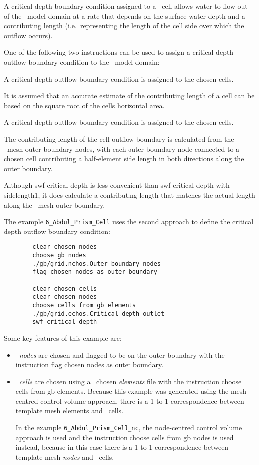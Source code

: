 A critical depth boundary condition assigned to a \swf\ cell allows water to flow out of the \swf\ model domain at a rate that depends on the surface water depth and a contributing length (i.e.\ representing the length of the cell side over which the outflow occurs).

\pagebreak
One of the following two  instructions can be used to assign a critical depth outflow boundary condition to the \swf\ model domain:

    {
          A critical depth outflow boundary condition is assigned to the chosen cells.

          It is assumed that an accurate estimate of the contributing length of a cell can be based on the square root of the cells horizontal area.
    }


    {
          A critical depth outflow boundary condition is assigned to the chosen cells.

          The contributing length of the cell outflow boundary is calculated from the \swf\ mesh outer boundary nodes, with each outer boundary node connected to a chosen cell contributing a half-element side length in both directions along the outer boundary.
    }

Although \textsf{swf critical depth} is less convenient than \textsf{swf critical depth with sidelength1}, it does calculate a contributing length that matches the actual length along the \swf\ mesh outer boundary.

The example \texttt{6\_Abdul\_Prism\_Cell} uses the second approach to define the critical depth outflow boundary condition:
\begin{verbatim}
        clear chosen nodes
        choose gb nodes
        ./gb/grid.nchos.Outer boundary nodes
        flag chosen nodes as outer boundary

        clear chosen cells
        clear chosen nodes
        choose cells from gb elements
        ./gb/grid.echos.Critical depth outlet
        swf critical depth
\end{verbatim}

Some key features of this example are:
\begin{itemize}
    \item \swf\ {\em nodes} are chosen and flagged to be on the outer boundary with the instruction \textsf{flag chosen nodes as outer boundary}.
    \item \swf\ {\em cells} are chosen using a \gb\ chosen {\em elements} file with the instruction \textsf{choose cells from gb elements}.  Because this example was generated using the mesh-centred control volume approach, there is a 1-to-1 correspondence between template mesh elements and \swf\ cells.

        In the example \texttt{6\_Abdul\_Prism\_Cell\_nc}, the node-centred control volume approach is used and the instruction \textsf{choose cells from gb nodes} is used instead, because in this case there is a 1-to-1 correspondence between template mesh {\em nodes} and \swf\ cells.
\end{itemize}

